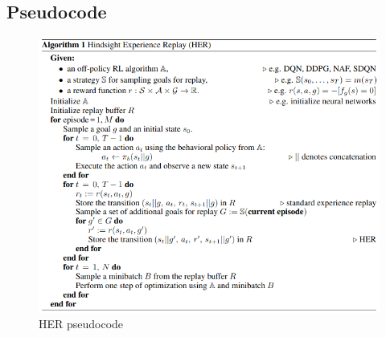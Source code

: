 \documentclass[12pt]{report}
\begin{document}
\subsection{Pseudocode}
\begin{figure}[H]
    \begin{center}
    \includegraphics[scale=0.6]{her_pseudocode.png}
    \end{center}
    \caption{HER pseudocode}
    \centering
\end{figure}
\end{document}
